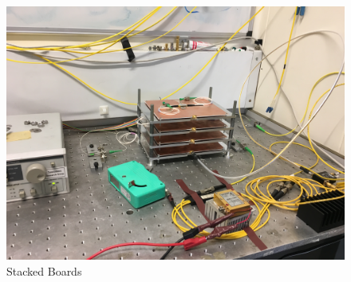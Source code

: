 \begin{figure}[ht]
    \centering
    \includegraphics[width=0.8\linewidth]{img/full_mount.jpeg}
    \caption{Stacked Boards}%
    \label{fig:full_mount}
\end{figure}
